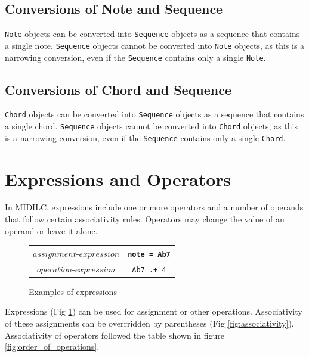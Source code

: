 \documentclass[12pt,A4]{book}
\begin{document}
\subsection{Conversions of Note and Sequence}
\verb|Note| objects can be converted into \verb|Sequence| objects as a sequence that contains a single note. \verb|Sequence| objects cannot be converted into \verb|Note| objects, as this is a narrowing conversion, even if the \verb|Sequence| contains only a single \verb|Note|.
\subsection{Conversions of Chord and Sequence}
\verb|Chord| objects can be converted into \verb|Sequence| objects as a sequence that contains a single chord. \verb|Sequence| objects cannot be converted into \verb|Chord| objects, as this is a narrowing conversion, even if the \verb|Sequence| contains only a single \verb|Chord|.
\section{Expressions and Operators}

In MIDILC, expressions include one or more operators and a number of operands that follow certain associativity rules. Operators may change the value of an operand or leave it alone. 

\begin{figure}
\center
\begin{tabular}{|c|c|}
\hline
$assignment\mbox{-}expression$  & \verb|note = Ab7| \\ \hline
$operation\mbox{-}expression$   & \verb|Ab7 .+ 4| \\ \hline
\end{tabular}
\label{fig:expressions}
\caption{Examples of expressions}
\end{figure}

Expressions (Fig \ref{fig:expressions}) can be used for assignment or other operations. Associativity of these assignments can be overrridden by parentheses (Fig \ref{fig:associativity}). Associativity of operators followed the table shown in figure \ref{fig:order_of_operations}.
\end{document}
